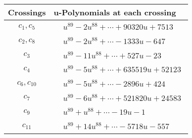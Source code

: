 \documentclass[1p]{elsarticle_modified}
\theoremstyle{definition}
\begin{document}
\begin{tabular}{m{50pt}|m{274pt}}
Crossings & \hspace{64pt}u-Polynomials at each crossing \\
\hline $$\begin{aligned}c_{1},c_{5}\end{aligned}$$&$\begin{aligned}
&u^{89}-2 u^{88}+\cdots+90320 u+7513
\end{aligned}$\\
\hline $$\begin{aligned}c_{2},c_{8}\end{aligned}$$&$\begin{aligned}
&u^{89}-2 u^{88}+\cdots-1333 u-647
\end{aligned}$\\
\hline $$\begin{aligned}c_{3}\end{aligned}$$&$\begin{aligned}
&u^{89}-11 u^{88}+\cdots+527 u-23
\end{aligned}$\\
\hline $$\begin{aligned}c_{4}\end{aligned}$$&$\begin{aligned}
&u^{89}-5 u^{88}+\cdots+635519 u+52123
\end{aligned}$\\
\hline $$\begin{aligned}c_{6},c_{10}\end{aligned}$$&$\begin{aligned}
&u^{89}-5 u^{88}+\cdots-2896 u+424
\end{aligned}$\\
\hline $$\begin{aligned}c_{7}\end{aligned}$$&$\begin{aligned}
&u^{89}-6 u^{88}+\cdots+521820 u+24583
\end{aligned}$\\
\hline $$\begin{aligned}c_{9}\end{aligned}$$&$\begin{aligned}
&u^{89}+u^{88}+\cdots-19 u-1
\end{aligned}$\\
\hline $$\begin{aligned}c_{11}\end{aligned}$$&$\begin{aligned}
&u^{89}+14 u^{88}+\cdots-5718 u-557
\end{aligned}$\\
\hline
\end{tabular}\\~\\
\end{document}

